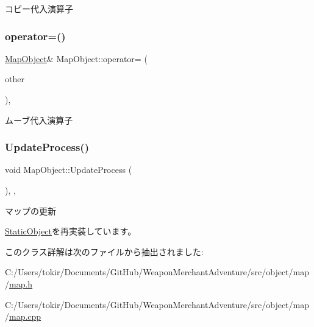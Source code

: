 コピー代入演算子 

\mbox{\label{class_map_object_ae36fa838f3f8bac8ef2d67b39adf0298}} 
\subsubsection{\texorpdfstring{operator=()}{operator=()}\hspace{0.1cm}{\footnotesize\ttfamily [2/2]}}
{\footnotesize\ttfamily \mbox{\hyperlink{class_map_object}{Map\+Object}}\& Map\+Object\+::operator= (\begin{DoxyParamCaption}\item[{\mbox{\hyperlink{class_map_object}{Map\+Object}} \&\&}]{other }\end{DoxyParamCaption})\hspace{0.3cm}{\ttfamily [inline]}, {\ttfamily [noexcept]}}



ムーブ代入演算子 

\mbox{\label{class_map_object_ab6b8849f15175417eca94b2703945e4b}} 
\subsubsection{\texorpdfstring{Update\+Process()}{UpdateProcess()}}
{\footnotesize\ttfamily void Map\+Object\+::\+Update\+Process (\begin{DoxyParamCaption}{ }\end{DoxyParamCaption})\hspace{0.3cm}{\ttfamily [final]}, {\ttfamily [protected]}, {\ttfamily [virtual]}}



マップの更新 



\mbox{\hyperlink{class_static_object_a7fa678c3c4032bb6e9417f93a8bb895c}{Static\+Object}}を再実装しています。



このクラス詳解は次のファイルから抽出されました\+:\begin{DoxyCompactItemize}
\item 
C\+:/\+Users/tokir/\+Documents/\+Git\+Hub/\+Weapon\+Merchant\+Adventure/src/object/map/\mbox{\hyperlink{map_8h}{map.\+h}}\item 
C\+:/\+Users/tokir/\+Documents/\+Git\+Hub/\+Weapon\+Merchant\+Adventure/src/object/map/\mbox{\hyperlink{map_8cpp}{map.\+cpp}}\end{DoxyCompactItemize}
